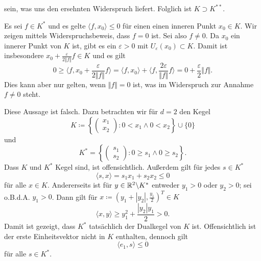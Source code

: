 \begin{compactenum}[(i)]
\begin{compactenum}
 sein, was uns den ersehnten Widerspruch liefert. Folglich ist $K\supset K^{**}$.
 \\
 \end{compactenum}
 \item  Es sei $f\in K^*$ und es gelte $\langle f, x_0\rangle\leq 0$ für einen einen inneren Punkt $x_0\in K$.
 Wir zeigen mittels Widerspruchsbeweis, dass $f=0$ ist. Sei also $f\neq0$. Da $x_0$ ein innerer Punkt von $K$ 
 ist, gibt es ein $\varepsilon>0$ mit $U_\varepsilon(x_0)\subset K$. Damit ist insbesondere 
 $x_0+\frac{\varepsilon}{2\Vert f \Vert} f\in K$ und es gilt
 \begin{displaymath}
  0\geq \langle f,x_0+\frac{\varepsilon}{2\Vert f \Vert} f\rangle
  = \langle f,x_0\rangle+\langle f,\frac{2\varepsilon}{\Vert f \Vert} f\rangle
  =0+\frac{\varepsilon}{2} \Vert f\Vert.
 \end{displaymath}
 Dies kann aber nur gelten, wenn $\Vert f\Vert=0$ ist, was im Widerspruch zur Annahme $f\neq 0$ steht.
 \\
 \item Diese Aussage ist falsch. Dazu betrachten wir für $d=2$ den Kegel
 \begin{displaymath}
  K\coloneqq\left\{\begin{pmatrix}x_1\\x_2\end{pmatrix}: 0< x_1 \land 0< x_2 \right\}\cup\{0\}
 \end{displaymath}
  und
  \begin{displaymath}
  K^*=\left\{\begin{pmatrix}s_1\\s_2\end{pmatrix}: 0\geq s_1 \land 0\geq s_2 \right\}.
 \end{displaymath}
 Dass $K$ und $K^*$ Kegel sind, ist offensichtlich. Außerdem gilt für jedes $s\in K^*$
 \begin{displaymath}
  \langle s,x\rangle =s_1x_1+s_2x_2\leq 0
 \end{displaymath}
 für alle $x\in K$. Andererseits ist für $y\in \mathbb{R}^2\backslash K^*$ entweder $y_1>0$ oder $y_2>0$;
 sei o.B.d.A. $y_1>0$. Dann gilt für $x\coloneqq(y_1+|y_2|,\frac{y_1}{2})^T\in K$
 \begin{displaymath}
  \langle x, y\rangle \geq y_1^2+\frac{|y_2|y_1}{2}>0.
 \end{displaymath}
 Damit ist gezeigt, dass $K^*$ tatsächlich der Dualkegel von $K$ ist. Offensichtlich ist der 
 erste Einheitsvektor nicht in $K$ enthalten, dennoch gilt
  \begin{displaymath}
  \langle e_1, s\rangle \leq 0
 \end{displaymath}
 für alle $s\in K^*$.
\end{compactenum}
